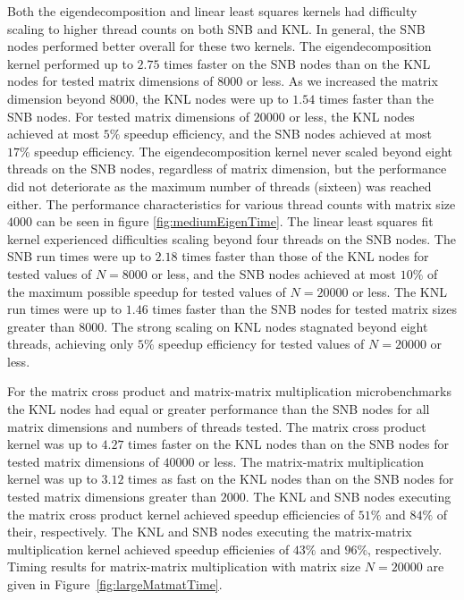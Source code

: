 Both the eigendecomposition and linear least squares kernels had difficulty scaling
to higher thread counts on both SNB and KNL. In general, the SNB nodes performed better
overall for these two kernels. The eigendecomposition kernel performed up to $2.75$ times
faster on the SNB nodes than on the KNL nodes for tested matrix dimensions of $8000$ or
less. As we increased the matrix dimension beyond $8000$, the KNL nodes were up to $1.54$
times faster than the SNB nodes. For tested matrix dimensions of $20000$ or less, the KNL
nodes achieved at most $5\%$ speedup efficiency, and the SNB nodes achieved
at most $17\%$ speedup efficiency. The eigendecomposition kernel never scaled
beyond eight threads on the SNB nodes, regardless of matrix dimension, but the performance
did not deteriorate as the maximum number of threads (sixteen) was reached either. The
performance characteristics for various thread counts with matrix size $4000$ can be seen
in figure \ref{fig:mediumEigenTime}. The linear least squares fit kernel experienced
difficulties scaling beyond four threads on the SNB nodes. The SNB run times were up to
$2.18$ times faster than those of the KNL nodes for tested values of $N=8000$ or less, and
the SNB nodes achieved at most $10\%$ of the maximum possible speedup for tested values of
$N=20000$ or less. The KNL run times were up to $1.46$ times faster than the SNB nodes for
tested matrix sizes greater than $8000$. The strong scaling on KNL nodes stagnated beyond
eight threads, achieving only $5\%$ speedup efficiency for tested values of
$N=20000$ or less.

For the matrix cross product and matrix-matrix multiplication microbenchmarks the KNL
nodes had equal or greater performance than the SNB nodes for all matrix dimensions and
numbers of threads tested. The matrix cross product kernel was up to $4.27$ times faster
on the KNL nodes than on the SNB nodes for tested matrix dimensions of $40000$ or less.
The matrix-matrix multiplication kernel was up to $3.12$ times as fast on the KNL nodes
than on the SNB nodes for tested matrix dimensions greater than $2000$. The KNL and SNB
nodes executing the matrix cross product kernel achieved speedup efficiencies of
$51\%$ and $84\%$ of their, respectively. The KNL and SNB nodes executing the matrix-matrix
multiplication kernel achieved speedup efficienies of $43\%$ and $96\%$, respectively.
Timing results for matrix-matrix multiplication with matrix size $N=20000$
are given in Figure~\ref{fig:largeMatmatTime}.

